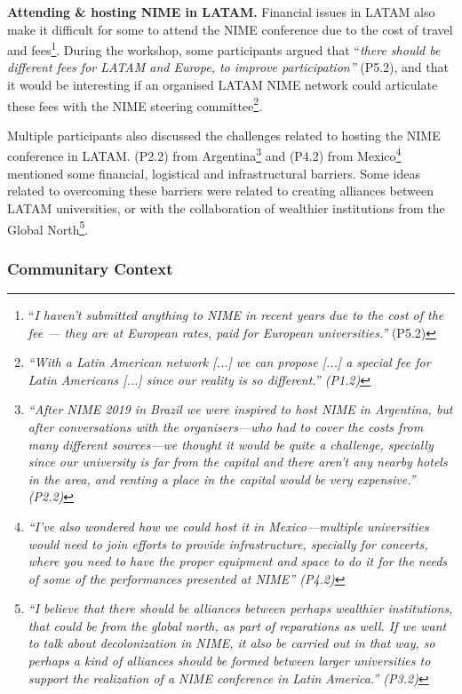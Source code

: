 \documentclass[sigconf]{nimeart}
\begin{document}
\textbf{Attending \& hosting NIME in LATAM.} Financial issues in LATAM also make it difficult for some to attend the NIME conference due to the cost of travel and fees\footnote{``\emph{I haven't submitted anything to NIME in recent years due to the cost of the fee --- they are at European rates, paid for European universities.''} (P5.2)}. During the workshop, some participants argued that ``\emph{there should be different fees for LATAM and Europe, to improve participation''} (P5.2), and that it would be interesting if an organised LATAM NIME network could articulate these fees with the NIME steering committee\footnote{\emph{``With a Latin American network {[}...{]} we can propose {[}...{]} a special fee for Latin Americans {[}...{]} since our reality is so different.'' (P1.2)}}.

Multiple participants also discussed the challenges related to hosting the NIME conference in LATAM. (P2.2) from Argentina\footnote{\emph{``After NIME 2019 in Brazil we were inspired to host NIME in Argentina, but after conversations with the organisers---who had to cover the costs from many different sources---we thought it would be quite a challenge, specially since our university is far from the capital and there aren't any nearby hotels in the area, and renting a place in the capital would be very expensive.'' (P2.2)}} and (P4.2) from Mexico\footnote{\emph{``I've also wondered how we could host it in Mexico---multiple universities would need to join efforts to provide infrastructure, specially for concerts, where you need to have the proper equipment and space to do it for the needs of some of the performances presented at NIME'' (P4.2)}} mentioned some financial, logistical and infrastructural barriers. Some ideas related to overcoming these barriers were related to creating alliances between LATAM universities, or with the collaboration of wealthier institutions from the Global North\footnote{\emph{``I believe that there should be alliances between perhaps wealthier institutions, that could be from the global north, as part of reparations as well. If we want to talk about decolonization in NIME, it also be carried out in that way, so perhaps a kind of alliances should be formed between larger universities to support the realization of a NIME conference in Latin America.'' (P3.2)}}.

\subsubsection{Communitary Context}\label{communitary-context}
\end{document}
